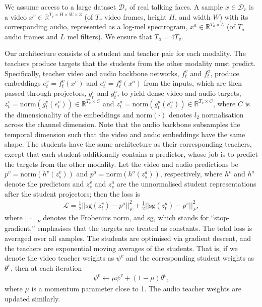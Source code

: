 \documentclass[10pt,twocolumn,letterpaper]{article}
\begin{document}
\begin{description}[wide,itemindent=\labelsep]

\item[Formulation.] We assume access to a large dataset $\mathcal{D}_r$ of real talking faces. A sample $x\in\mathcal{D}_r$ is a video $x^v\in\mathbb{R}^{T_v\times H\times W \times 3}$ (of $T_v$ video frames, height $H$, and width $W$) with its corresponding audio, represented as a log-mel spectrogram, $x^a\in\mathbb{R}^{T_a\times L}$ (of $T_a$ audio frames and $L$ mel filters). We ensure that $T_a=4T_v$.

Our architecture consists of a student and teacher pair for each modality. The teachers produce targets that the students from the other modality must predict. Specifically, teacher video and audio backbone networks, $f^v_t$ and $f^a_t$, produce embeddings $e^v_t=f^v_t(x^v)$ and $e^a_t=f^a_t(x^a)$ from the inputs, which are then passed through projectors, $g^v_t$ and $g^a_t$, to yield dense video and audio targets, $z^v_t=\text{norm}(g^v_t(e^v_t))\in\mathbb{R}^{T_v\times C}$ and $z^a_t=\text{norm}(g^a_t(e^a_t))\in\mathbb{R}^{T_v\times C}$, where $C$ is the dimensionality of the embeddings and $\text{norm}(\cdot)$ denotes $l_2$ normalisation across the channel dimension. Note that the audio backbone subsamples the temporal dimension such that the video and audio embeddings have the same shape. The students have the same architecture as their corresponding teachers, except that each student additionally contains a predictor, whose job is to predict the targets from the other modality. Let the video and audio predictions be $p^v=\text{norm}(h^v(z^v_s))$ and $p^a=\text{norm}(h^a(z^a_s))$, respectively, where $h^v$ and $h^a$ denote the predictors and $z^v_s$ and $z^a_s$ are the unnormalised student representations after the student projectors; then the loss is
\begin{align} \label{eq:prediction_loss}
    \mathcal{L}=\frac{1}{2}||\text{sg}\left(z^v_t\right)-p^a||^2_F+\frac{1}{2}||\text{sg}\left(z^a_t\right)-p^v||^2_F,
\end{align}
where $||\cdot||_F$ denotes the Frobenius norm, and sg, which stands for ``stop-gradient,'' emphasises that the targets are treated as constants. The total loss is averaged over all samples. The students are optimised via gradient descent, and the teachers are exponential moving averages of the students. That is, if we denote the video teacher weights as $\psi^v$ and the corresponding student weights as $\theta^v$, then at each iteration
\begin{align}
    \psi^v\leftarrow\mu\psi^v+(1-\mu)\theta^v,
\end{align}
where $\mu$ is a momentum parameter close to 1. The audio teacher weights are updated similarly.


\end{description}
\end{document}

